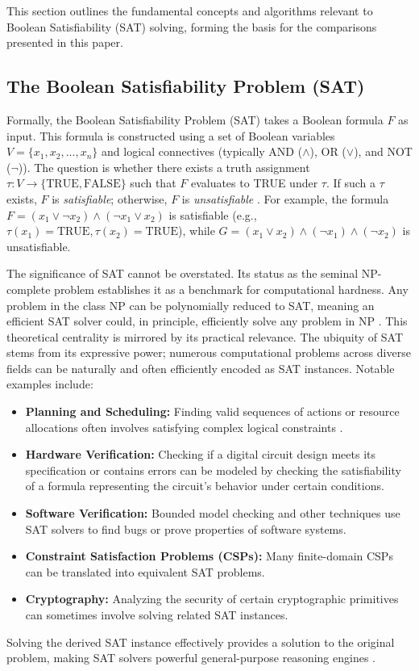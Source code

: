 \documentclass[12pt, a4paper]{article}
\begin{document}
This section outlines the fundamental concepts and algorithms relevant to Boolean Satisfiability (SAT) solving, forming the basis for the comparisons presented in this paper.

\subsection{The Boolean Satisfiability Problem (SAT)}
\label{subsec:sat_definition}

Formally, the Boolean Satisfiability Problem (SAT) takes a Boolean formula $F$ as input. This formula is constructed using a set of Boolean variables $V = \{x_1, x_2, ..., x_n\}$ and logical connectives (typically AND ($\land$), OR ($\lor$), and NOT ($\lnot$)). The question is whether there exists a truth assignment $\tau: V \to \{\text{TRUE}, \text{FALSE}\}$ such that $F$ evaluates to TRUE under $\tau$. If such a $\tau$ exists, $F$ is \emph{satisfiable}; otherwise, $F$ is \emph{unsatisfiable} \cite{Autoblocks}. For example, the formula $F = (x_1 \lor \lnot x_2) \land (\lnot x_1 \lor x_2)$ is satisfiable (e.g., $\tau(x_1)=\text{TRUE}, \tau(x_2)=\text{TRUE}$), while $G = (x_1 \lor x_2) \land (\lnot x_1) \land (\lnot x_2)$ is unsatisfiable.

The significance of SAT cannot be overstated. Its status as the seminal NP-complete problem establishes it as a benchmark for computational hardness. Any problem in the class NP can be polynomially reduced to SAT, meaning an efficient SAT solver could, in principle, efficiently solve any problem in NP \cite{Cook1971}. This theoretical centrality is mirrored by its practical relevance. The ubiquity of SAT stems from its expressive power; numerous computational problems across diverse fields can be naturally and often efficiently encoded as SAT instances. Notable examples include:
\begin{itemize}
    \item \textbf{Planning and Scheduling:} Finding valid sequences of actions or resource allocations often involves satisfying complex logical constraints \cite{Autoblocks}.
    \item \textbf{Hardware Verification:} Checking if a digital circuit design meets its specification or contains errors can be modeled by checking the satisfiability of a formula representing the circuit's behavior under certain conditions.
    \item \textbf{Software Verification:} Bounded model checking and other techniques use SAT solvers to find bugs or prove properties of software systems.
    \item \textbf{Constraint Satisfaction Problems (CSPs):} Many finite-domain CSPs can be translated into equivalent SAT problems.
    \item \textbf{Cryptography:} Analyzing the security of certain cryptographic primitives can sometimes involve solving related SAT instances.
\end{itemize}
Solving the derived SAT instance effectively provides a solution to the original problem, making SAT solvers powerful general-purpose reasoning engines \cite{Autoblocks}.
\end{document}
